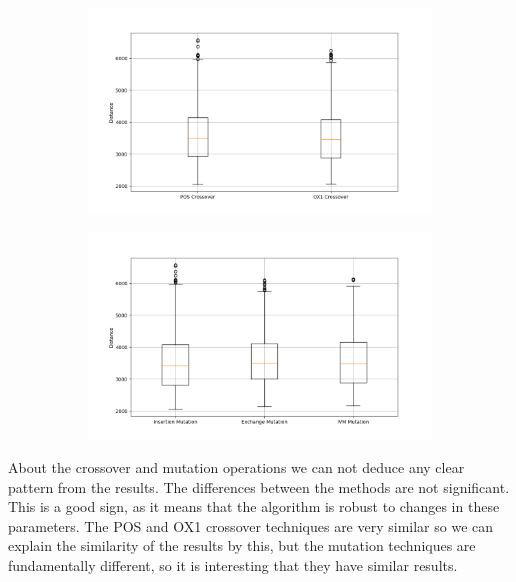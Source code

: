 \documentclass[11pt]{article}
\begin{document}
\begin{figure}[H]
    \centering
    \begin{subfigure}{0.48\textwidth}
        \includegraphics[width=\textwidth]{../results/crossover_method_boxplot.png}
        \label{fig:crossover}
    \end{subfigure}
    \begin{subfigure}{0.48\textwidth}
        \includegraphics[width=\textwidth]{../results/mutation_method_boxplot.png}
        \label{fig:mutation}
    \end{subfigure}
\end{figure}

About the crossover and mutation operations we can not deduce any clear pattern from the results. The differences between the methods are not significant. This is a good sign, as it means that the algorithm is robust to changes in these parameters. The POS and OX1 crossover techniques are very similar so we can explain the similarity of the results by this, but the mutation techniques are fundamentally different, so it is interesting that they have similar results. 
\end{document}
